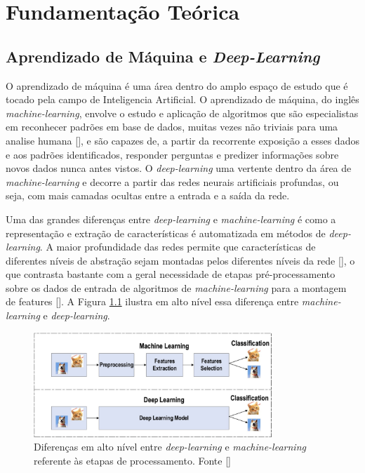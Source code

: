 \chapter{Fundamentação Teórica}


\section{Aprendizado de Máquina e \textit{Deep-Learning}}
O aprendizado de máquina é uma área dentro do amplo espaço de estudo que é tocado pela campo de Inteligencia Artificial. O aprendizado de máquina, do inglês \textit{machine-learning}, envolve o estudo e aplicação de algoritmos que são especialistas em reconhecer padrões em base de dados, muitas vezes não triviais para uma analise humana [], e são capazes de, a partir da recorrente exposição a esses dados e aos padrões identificados, responder perguntas e predizer informações sobre novos dados nunca antes vistos. O \textit{deep-learning} uma vertente dentro da área de \textit{machine-learning} e decorre a partir das redes neurais artificiais profundas, ou seja, com mais camadas ocultas entre a entrada e a saída da rede.

Uma das grandes diferenças entre \textit{deep-learning} e \textit{machine-learning} é como a representação e extração de características é automatizada em métodos de \textit{deep-learning}. A maior profundidade das redes permite que características de diferentes níveis de abstração sejam montadas pelos diferentes níveis da rede [], o que contrasta bastante com a geral necessidade de etapas pré-processamento sobre os dados de entrada de algoritmos de \textit{machine-learning} para a montagem de features []. A Figura \ref{fig:dl_vs_ml} ilustra em alto nível essa diferença entre \textit{machine-learning} e \textit{deep-learning}.

\begin{figure}
    \centering
    \includegraphics[width=0.8\textwidth]{figs/theory-ml-vs-dl.png}
    \caption{Diferenças em alto nível entre \textit{deep-learning} e \textit{machine-learning} referente às etapas de processamento. Fonte []}
    \label{fig:dl_vs_ml}
\end{figure}

